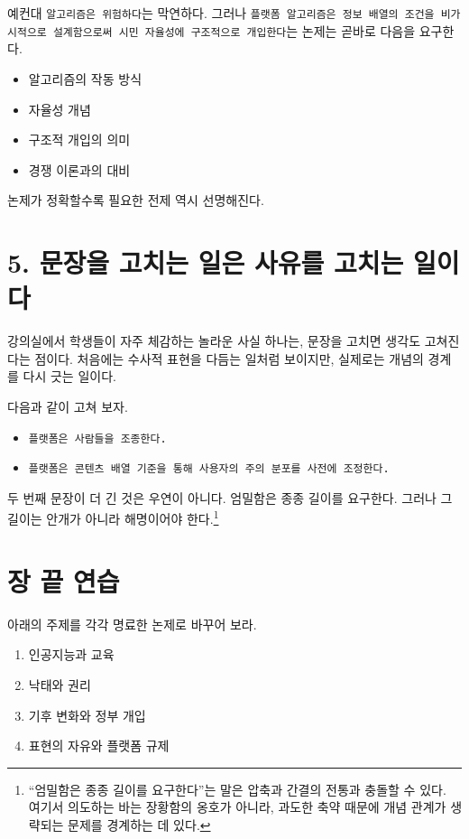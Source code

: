 예컨대 \texttt{알고리즘은\ 위험하다}는 막연하다. 그러나 \texttt{플랫폼\ 알고리즘은\ 정보\ 배열의\ 조건을\ 비가시적으로\ 설계함으로써\ 시민\ 자율성에\ 구조적으로\ 개입한다}는 논제는 곧바로 다음을 요구한다.

\begin{itemize}
\tightlist
\item
  알고리즘의 작동 방식
\item
  자율성 개념
\item
  구조적 개입의 의미
\item
  경쟁 이론과의 대비
\end{itemize}

논제가 정확할수록 필요한 전제 역시 선명해진다.

\section{5. 문장을 고치는 일은 사유를 고치는 일이다}\label{5-uxbb38uxc7a5uxc744-uxace0uxce58uxb294-uxc77cuxc740-uxc0acuxc720uxb97c-uxace0uxce58uxb294-uxc77cuxc774uxb2e4}

강의실에서 학생들이 자주 체감하는 놀라운 사실 하나는, 문장을 고치면 생각도 고쳐진다는 점이다. 처음에는 수사적 표현을 다듬는 일처럼 보이지만, 실제로는 개념의 경계를 다시 긋는 일이다.

다음과 같이 고쳐 보자.

\begin{itemize}
\tightlist
\item
  \texttt{플랫폼은\ 사람들을\ 조종한다.}
\item
  \texttt{플랫폼은\ 콘텐츠\ 배열\ 기준을\ 통해\ 사용자의\ 주의\ 분포를\ 사전에\ 조정한다.}
\end{itemize}

두 번째 문장이 더 긴 것은 우연이 아니다. 엄밀함은 종종 길이를 요구한다. 그러나 그 길이는 안개가 아니라 해명이어야 한다.\footnote{``엄밀함은 종종 길이를 요구한다''는 말은 압축과 간결의 전통과 충돌할 수 있다. 여기서 의도하는 바는 장황함의 옹호가 아니라, 과도한 축약 때문에 개념 관계가 생략되는 문제를 경계하는 데 있다.}

\section{장 끝 연습}\label{uxc7a5-uxb05d-uxc5f0uxc2b5}

아래의 주제를 각각 명료한 논제로 바꾸어 보라.

\begin{enumerate}
\def\labelenumi{\arabic{enumi}.}
\tightlist
\item
  인공지능과 교육
\item
  낙태와 권리
\item
  기후 변화와 정부 개입
\item
  표현의 자유와 플랫폼 규제
\end{enumerate}

